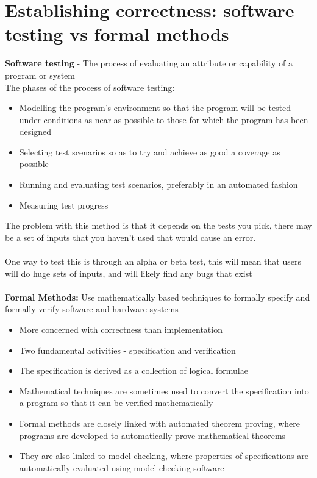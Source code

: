 \documentclass{article}[18pt]
\begin{document}
\section{Establishing correctness: software testing vs formal methods}
\textbf{Software testing} - The process of evaluating an attribute or capability of a program or system\\
The phases of the process of software testing:
\begin{itemize}
	\item Modelling the program's environment so that the program will be tested under conditions as near as possible to those for which the program has been designed
	\item Selecting test scenarios so as to try and achieve as good a coverage as possible 
	\item Running and evaluating test scenarios, preferably in an automated fashion
	\item Measuring test progress
\end{itemize}
The problem with this method is that it depends on the tests you pick, there may be a set of inputs that you haven't used that would cause an error.\\
\\
One way to test this is through an alpha or beta test, this will mean that users will do huge sets of inputs, and will likely find any bugs that exist\\
\\
\textbf{Formal Methods:} Use mathematically based techniques to formally specify and formally verify software and hardware systems
\begin{itemize}
	\item More concerned with correctness than implementation
	\item Two fundamental activities - specification and verification
	\item The specification is derived as a collection of logical formulae
	\item Mathematical techniques are sometimes used to convert the specification into a program so that it can be verified mathematically
	\item Formal methods are closely linked with automated theorem proving, where programs are developed to automatically prove mathematical theorems
	\item They are also linked to model checking, where properties of specifications are automatically evaluated using model checking software
\end{itemize}
\end{document}
